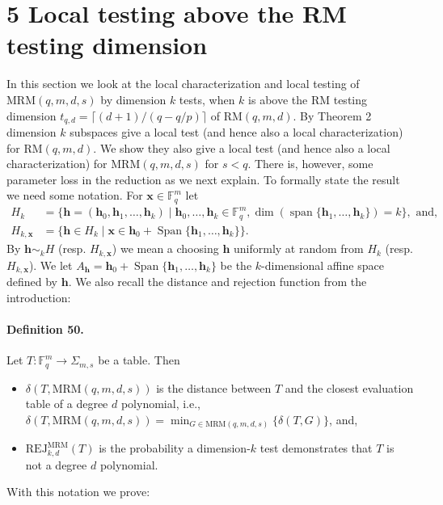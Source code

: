 \documentclass[10pt,a4paper]{article}
\begin{document}
\section*{5 Local testing above the RM testing dimension}
In this section we look at the local characterization and local testing of $\mathrm{MRM}(q,m,d,s)$ by dimension $k$ tests, when $k$ is above the RM testing dimension $t_{q,d}=\lceil(d+1)/(q-q/p)\rceil$ of $\mathrm{RM}(q,m,d)$. By Theorem 2 dimension $k$ subspaces give a local test (and hence also a local characterization) for $\mathrm{RM}(q,m,d)$. We show they also give a local test (and hence also a local characterization) for $\mathrm{MRM}(q,m,d,s)$ for $s<q$. There is, however, some parameter loss in the reduction as we next explain. To formally state the result we need some notation. For $\boldsymbol x\in\mathbb F_q^m$ let
\begin{align*}
H_k&=\{\boldsymbol h=(\boldsymbol h_0,\boldsymbol h_1,\ldots,\boldsymbol h_k)\mid\boldsymbol h_0,\ldots,\boldsymbol h_k\in\mathbb F_q^m,\dim(\operatorname{span}\{\boldsymbol h_1,\ldots,\boldsymbol h_k\})=k\},\text{ and,}\\
H_{k,\boldsymbol x}&=\{\boldsymbol h\in H_k\mid\boldsymbol x\in\boldsymbol h_0+\operatorname{Span}\{\boldsymbol h_1,\ldots,\boldsymbol h_k\}\}.
\end{align*}
By $\boldsymbol h\sim_kH$ (resp. $H_{k,\boldsymbol x}$) we mean a choosing $\boldsymbol h$ uniformly at random from $H_k$ (resp. $H_{k,\boldsymbol x}$). We let $A_{\boldsymbol h}=\boldsymbol h_0+\operatorname{Span}\{\boldsymbol h_1,\ldots,\boldsymbol h_k\}$ be the $k$-dimensional affine space defined by $\boldsymbol h$. We also recall the distance and rejection function from the introduction:
\paragraph{Definition 50.} Let $T:\mathbb F_q^m\to\Sigma_{m,s}$ be a table. Then
\begin{itemize}
\item $\delta(T,\mathrm{MRM}(q,m,d,s))$ is the distance between $T$ and the closest evaluation table of a degree $d$ polynomial, i.e., $\delta(T,\mathrm{MRM}(q,m,d,s))=\min_{G\in\mathrm{MRM}(q,m,d,s)}\{\delta(T,G)\}$, and,
\item $\mathrm{REJ}_{k,d}^{\mathrm{MRM}}(T)$ is the probability a dimension-$k$ test demonstrates that $T$ is not a degree $d$ polynomial.
\end{itemize}
With this notation we prove:
\end{document}
